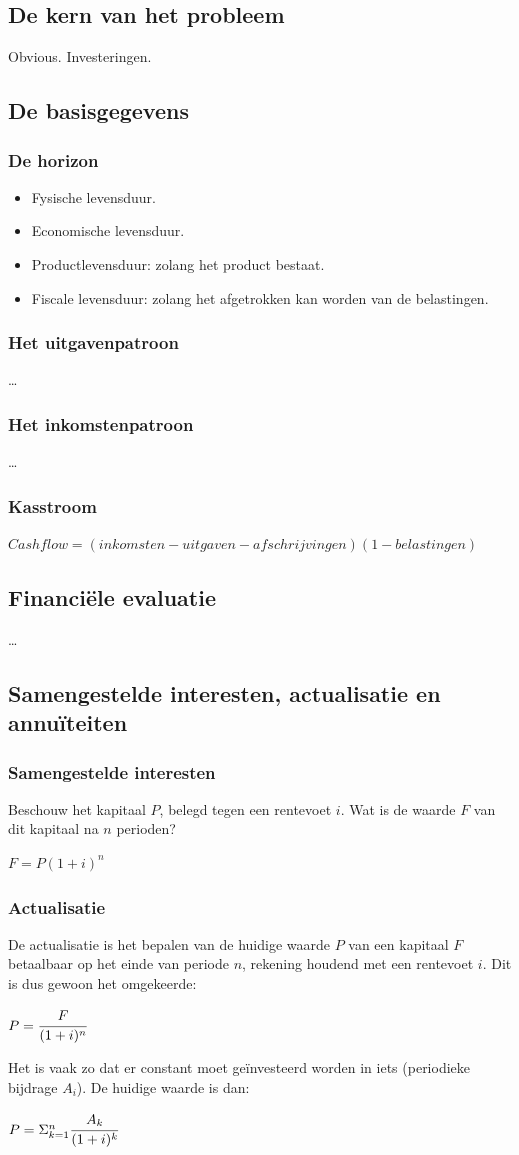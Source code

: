 \documentclass[12pt]{article}
\begin{document}
\subsection{De kern van het probleem}
Obvious. Investeringen.
\subsection{De basisgegevens}
\subsubsection{De horizon}
\begin{itemize}
\item Fysische levensduur.
\item Economische levensduur.
\item Productlevensduur: zolang het product bestaat.
\item Fiscale levensduur: zolang het afgetrokken kan worden van de belastingen.
\end{itemize}
\subsubsection{Het uitgavenpatroon}
\dots
\subsubsection{Het inkomstenpatroon}
\dots
\subsubsection{Kasstroom}
$Cashflow = (inkomsten - uitgaven - afschrijvingen)(1-belastingen)$
\subsection{Financi\"ele evaluatie}
\dots
\subsection{Samengestelde interesten, actualisatie en annu\"iteiten}
\subsubsection{Samengestelde interesten}
Beschouw het kapitaal $P$, belegd tegen een rentevoet $i$. Wat is de waarde $F$ van dit kapitaal na $n$ perioden?
\begin{center}
$F = P(1+i)^n$
\end{center}
\subsubsection{Actualisatie}
De actualisatie is het bepalen van de huidige waarde $P$ van een kapitaal $F$ betaalbaar op het einde van periode $n$, rekening houdend met een rentevoet $i$. Dit is dus gewoon het omgekeerde:
\begin{center}
$P = \cfrac{F}{(1+i)^n}$
\end{center}
Het is vaak zo dat er constant moet ge\"investeerd worden in iets (periodieke bijdrage $A_i$). De huidige waarde is dan:
\begin{center}
$P = \Sigma_{k = 1}^n\cfrac{A_k}{(1+i)^k}$
\end{center}
\end{document}
